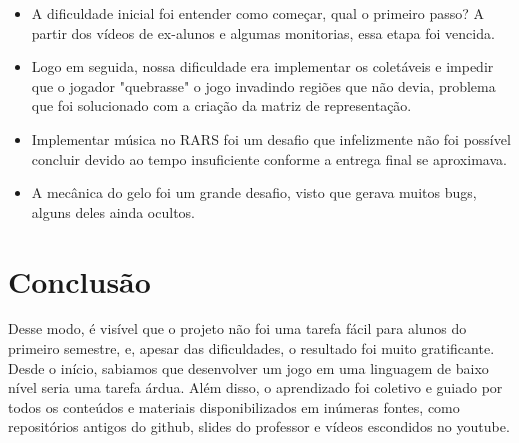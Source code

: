 \documentclass[a4paper]{sbgames}
\begin{document}
\begin{itemize}
    \item A dificuldade inicial foi entender como começar, qual o primeiro passo? A partir dos vídeos de ex-alunos e algumas monitorias, essa etapa foi vencida.
    
    \item Logo em seguida, nossa dificuldade era implementar os coletáveis e impedir que o jogador "quebrasse" o jogo invadindo regiões que não devia, problema que foi solucionado com a criação da matriz de representação.
    
    \item Implementar música no RARS foi um desafio que infelizmente não foi possível concluir devido ao tempo insuficiente conforme a entrega final se aproximava.
    
    \item A mecânica do gelo foi um grande desafio, visto que gerava muitos bugs, alguns deles ainda ocultos.
\end{itemize}





\section{Conclusão}
\label{sec:Conclusao}

Desse modo, é visível que o projeto não foi uma tarefa fácil para alunos do primeiro semestre, e, apesar das dificuldades, o resultado foi muito gratificante. Desde o início, sabiamos que desenvolver um jogo em uma linguagem de baixo nível seria uma tarefa árdua. Além disso, o aprendizado foi coletivo e guiado por todos os conteúdos e materiais disponibilizados em inúmeras fontes, como repositórios antigos do github, slides do professor e vídeos escondidos no youtube.
\end{document}
